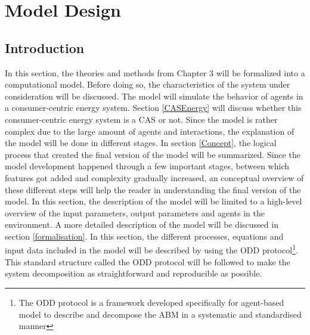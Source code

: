 \chapter{Model Design}
\section{Introduction}
In this section, the theories and methods from Chapter 3 will be formalized into a computational model. Before doing so, the characteristics of the system under consideration will be discussed. The model will simulate the behavior of agents in a consumer-centric energy system. Section \ref{CASEnergy} will discuss whether this consumer-centric energy system is a CAS or not. Since the model is rather complex due to the large amount of agents and interactions, the explanation of the model will be done in different stages. In section \ref{Concept}, the logical process that created the final version of the model will be summarized. Since the model development happened through a few important stages, between which features got added and complexity gradually increased, an conceptual overview of these different steps will help the reader in understanding the final version of the model. In this section, the description of the model will be limited to a high-level overview of the input parameters, output parameters and agents in the environment. A more detailed description of the model will be discussed in section \ref{formalisation}. In this section, the different processes, equations and input data included in the model will be described by using the ODD protocol\footnote{The ODD protocol is a framework developed specifically for agent-based model to describe and decompose the ABM in a systematic and standardised manner}. This standard structure called the ODD protocol will be followed to make the system decomposition as straightforward and reproducible as possible.

